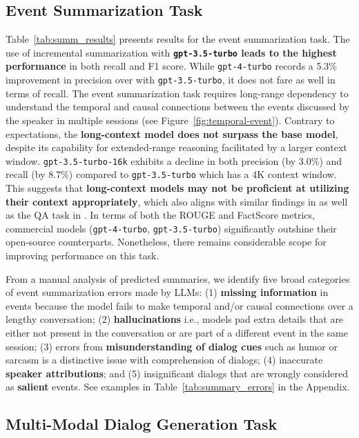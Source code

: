 \subsection{Event Summarization Task}
\label{ssec:event-results}

Table~\ref{tab:summ_results} presents results for the event summarization task. The use of incremental summarization with \textbf{\texttt{gpt-3.5-turbo} leads to the highest performance} in both recall and F1 score. While \texttt{gpt-4-turbo} records a 5.3\% improvement in precision over with \texttt{gpt-3.5-turbo}, it does not fare as well in terms of recall. The event summarization task requires long-range dependency to understand the temporal and causal connections between the events discussed by the speaker in multiple sessions (see Figure~\ref{fig:temporal-event}). Contrary to expectations, the \textbf{long-context model does not surpass the base model}, despite its capability for extended-range reasoning facilitated by a larger context window. \texttt{gpt-3.5-turbo-16k} exhibits a decline in both precision (by 3.0\%) and recall (by 8.7\%) compared to \texttt{gpt-3.5-turbo} which has a 4K context window. This suggests that \textbf{long-context models may not be proficient at utilizing their context appropriately}, which also aligns with similar findings in \citet{li2023loogle} as well as the QA task in \dataset{}. In terms of both the ROUGE and FactScore metrics, commercial models (\texttt{gpt-4-turbo}, \texttt{gpt-3.5-turbo}) significantly outshine their open-source counterparts. Nonetheless, there remains considerable scope for improving performance on this task.

From a manual analysis of predicted summaries, we identify five broad categories of event summarization errors made by LLMs: (1) \textbf{missing information} in events because the model fails to make temporal and/or causal connections over a lengthy conversation; (2) \textbf{hallucinations} i.e., models pad extra details that are either not present in the conversation or are part of a different event in the same session; (3) errors from \textbf{misunderstanding of dialog cues} such as humor or sarcasm is a distinctive issue with comprehension of dialogs; (4) inaccurate \textbf{speaker attributions}; and (5) insignificant dialogs that are wrongly considered as \textbf{salient} events. See examples in Table~\ref{tab:summary_errors} in the Appendix.



\subsection{Multi-Modal Dialog Generation Task}
\label{ssec:dialog-results}

